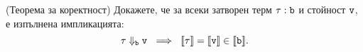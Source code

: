 \begin{problem}(Теорема за коректност)
  Докажете, че за всеки затворен терм $\tau : \texttt{b}$ и стойност $\texttt{v}$, е изпълнена импликацията:
  \[\tau \Downarrow_{\vv{b}} \vv{v}\ \implies\ \val{\tau} = \val{\vv{v}} \in \val{\vv{b}}.\]
\end{problem}


